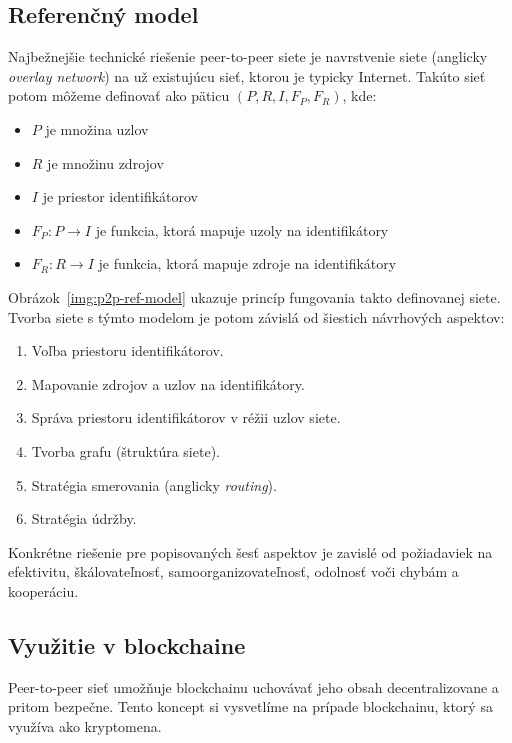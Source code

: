 \subsection{Referenčný model}
Najbežnejšie technické riešenie peer-to-peer siete je navrstvenie siete (anglicky \textit{overlay network}) na už existujúcu sieť, ktorou je typicky Internet. Takúto sieť potom môžeme definovať ako päticu $(P,R,I,F_P,F_R)$, kde:
\begin{itemize}
	\item $P$ je množina uzlov
	\item $R$ je množinu zdrojov
	\item $I$ je priestor identifikátorov
	\item $F_P: P \rightarrow I$ je funkcia, ktorá mapuje uzoly na identifikátory
	\item $F_R: R \rightarrow I$ je funkcia, ktorá mapuje zdroje na identifikátory
\end{itemize}

Obrázok~\ref{img:p2p-ref-model} ukazuje princíp fungovania takto definovanej siete. Tvorba siete s týmto modelom je potom závislá od šiestich návrhových aspektov:
\begin{enumerate}
	\item Voľba priestoru identifikátorov.
	\item Mapovanie zdrojov a uzlov na identifikátory.
	\item Správa priestoru identifikátorov v réžii uzlov siete.
	\item Tvorba grafu (štruktúra siete).
	\item Stratégia smerovania (anglicky \textit{routing}).
	\item Stratégia údržby.
\end{enumerate}
Konkrétne riešenie pre popisovaných šesť aspektov je zavislé od požiadaviek na efektivitu, škálovateľnosť, samoorganizovateľnosť, odolnosť voči chybám a kooperáciu.~\cite{p2pEssence}

\subsection{Využitie v blockchaine}

Peer-to-peer sieť umožňuje blockchainu uchovávať jeho obsah decentralizovane a pritom bezpečne. Tento koncept si vysvetlíme na prípade blockchainu, ktorý sa využíva ako kryptomena.

